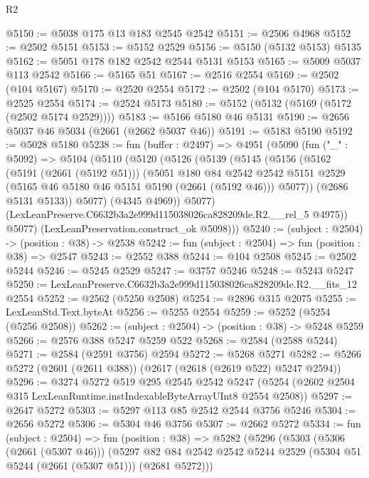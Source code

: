 \begin{lexlean}{R2}
\begin{coremodule}
@5150 := @5038 @175 @13 @183 @2545 @2542
@5151 := @2506 @4968
@5152 := @2502 @5151
@5153 := @5152 @2529
@5156 := @5150 (@5132 @5153) @5135
@5162 := @5051 @178 @182 @2542 @2544 @5131 @5153
@5165 := @5009 @5037 @113 @2542
@5166 := @5165 @51
@5167 := @2516 @2554
@5169 := @2502 (@104 @5167)
@5170 := @2520 @2554
@5172 := @2502 (@104 @5170)
@5173 := @2525 @2554
@5174 := @2524 @5173
@5180 := @5152 (@5132 (@5169 (@5172 (@2502 @5174 @2529))))
@5183 := @5166 @5180 @46 @5131
@5190 := @2656 @5037 @46 @5034 (@2661 (@2662 @5037 @46))
@5191 := @5183 @5190
@5192 := @5028 @5180
@5238 := fun (buffer : @2497) =>
  @4951
    (@5090
      (fun ("_" : @5092) =>
      @5104
        (@5110
          (@5120
            (@5126
              (@5139
                (@5145
                  (@5156
                    (@5162
                      (@5191 (@2661 (@5192 @51)))
                      (@5051
                        @180
                        @84
                        @2542
                        @2542
                        @5151
                        @2529
                        (@5165 @46 @5180 @46 @5151 @5190 (@2661 (@5192 @46)))
                        @5077))
                    (@2686 @5131 @5133))
                  @5077)
                (@4345 @4969))
              @5077)
            (LexLeanPreserve.C6632b3a2e999d115038026ca828209de.R2.__rel_5 @4975))
          @5077)
        (LexLeanPreservation.construct_ok @5098)))
@5240 := (subject : @2504) -> (position : @38) -> @2538
@5242 := fun (subject : @2504) => fun (position : @38) => @2547
@5243 := @2552 @388
@5244 := @104 @2508
@5245 := @2502 @5244
@5246 := @5245 @2529
@5247 := @3757 @5246
@5248 := @5243 @5247
@5250 := LexLeanPreserve.C6632b3a2e999d115038026ca828209de.R2.__fits_12 @2554
@5252 := @2562 (@5250 @2508)
@5254 := @2896 @315 @2075
@5255 := LexLeanStd.Text.byteAt
@5256 := @5255 @2554
@5259 := @5252 (@5254 (@5256 @2508))
@5262 := (subject : @2504) -> (position : @38) -> @5248 @5259
@5266 := @2576 @388 @5247 @5259 @522
@5268 := @2584 (@2588 @5244)
@5271 := @2584 (@2591 @3756) @2594
@5272 := @5268 @5271
@5282 := @5266 @5272 (@2601 (@2611 @388)) (@2617 (@2618 (@2619 @522) @5247 @2594))
@5296 := @3274
    @5272
    @519
    @295
    @2545
    @2542
    @5247
    (@5254 (@2602 @2504 @315 LexLeanRuntime.instIndexableByteArrayUInt8 @2554 @2508))
@5297 := @2647 @5272
@5303 := @5297 @113 @85 @2542 @2544 @3756 @5246
@5304 := @2656 @5272
@5306 := @5304 @46 @3756
@5307 := @2662 @5272
@5334 := fun (subject : @2504) =>
  fun (position : @38) =>
  @5282
    (@5296
      (@5303
        (@5306 (@2661 (@5307 @46)))
        (@5297 @82 @84 @2542 @2542 @5244 @2529 (@5304 @51 @5244 (@2661 (@5307 @51))) (@2681 @5272)))

\end{coremodule}
\end{lexlean}
